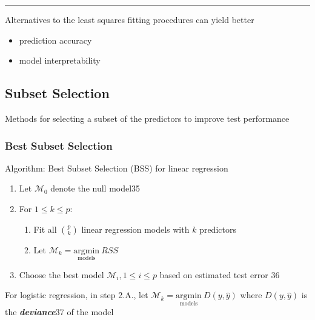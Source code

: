 \documentclass[11pt]{article}
\providecommand{\tightlist}{%
      \setlength{\itemsep}{0pt}\setlength{\parskip}{0pt}}
\begin{document}
\begin{center}\rule{0.5\linewidth}{\linethickness}\end{center}

    Alternatives to the least squares fitting procedures can yield better

\begin{itemize}
\tightlist
\item
  prediction accuracy
\item
  model interpretability
\end{itemize}

    \hypertarget{subset-selection}{%
\subsection{Subset Selection}\label{subset-selection}}

    Methods for selecting a subset of the predictors to improve test
performance

    \hypertarget{best-subset-selection}{%
\subsubsection{Best Subset Selection}\label{best-subset-selection}}

    Algorithm: Best Subset Selection (BSS) for linear regression

    \begin{enumerate}
\def\labelenumi{\arabic{enumi}.}
\tightlist
\item
  Let \(\mathcal{M}_0\) denote the null model35
\item
  For \(1 \leqslant k \leqslant p\):

  \begin{enumerate}
  \def\labelenumii{\arabic{enumii}.}
  \tightlist
  \item
    Fit all \(\binom{p}{k}\) linear regression models with \(k\)
    predictors
  \item
    Let \(\mathcal{M}_k = \underset{\text{models}}{\text{argmin}}\ RSS\)
  \end{enumerate}
\item
  Choose the best model \(\mathcal{M}_i, 1 \leqslant i \leqslant p\)
  based on estimated test error 36
\end{enumerate}

For logistic regression, in step 2.A., let
\(\mathcal{M}_k = \underset{\text{models}}{\text{argmin}}\ D(y, \hat{y})\)
where \(D(y, \hat{y})\) is the \textbf{\emph{deviance}}37 of the model
\end{document}
